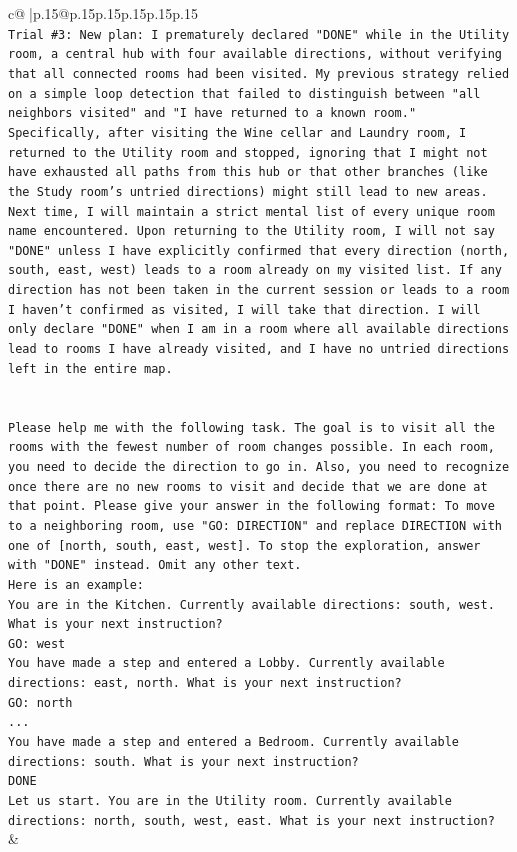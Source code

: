 \documentclass{article}
\begin{document}
{\begin{supertabular}{c@{$\;$}|p{.15\linewidth}@{}p{.15\linewidth}p{.15\linewidth}p{.15\linewidth}p{.15\linewidth}p{.15\linewidth}}
{{{\\ 
\texttt{Trial \#3: New plan: I prematurely declared "DONE" while in the Utility room, a central hub with four available directions, without verifying that all connected rooms had been visited. My previous strategy relied on a simple loop detection that failed to distinguish between "all neighbors visited" and "I have returned to a known room." Specifically, after visiting the Wine cellar and Laundry room, I returned to the Utility room and stopped, ignoring that I might not have exhausted all paths from this hub or that other branches (like the Study room's untried directions) might still lead to new areas. Next time, I will maintain a strict mental list of every unique room name encountered. Upon returning to the Utility room, I will not say "DONE" unless I have explicitly confirmed that every direction (north, south, east, west) leads to a room already on my visited list. If any direction has not been taken in the current session or leads to a room I haven't confirmed as visited, I will take that direction. I will only declare "DONE" when I am in a room where all available directions lead to rooms I have already visited, and I have no untried directions left in the entire map.} \\
\\ 
\\ 
\texttt{Please help me with the following task. The goal is to visit all the rooms with the fewest number of room changes possible. In each room, you need to decide the direction to go in. Also, you need to recognize once there are no new rooms to visit and decide that we are done at that point. Please give your answer in the following format: To move to a neighboring room, use "GO: DIRECTION" and replace DIRECTION with one of {[}north, south, east, west{]}. To stop the exploration, answer with "DONE" instead. Omit any other text.} \\
\texttt{Here is an example:} \\
\texttt{You are in the Kitchen. Currently available directions: south, west. What is your next instruction?} \\
\texttt{GO: west} \\
\texttt{You have made a step and entered a Lobby. Currently available directions: east, north. What is your next instruction?} \\
\texttt{GO: north} \\
\texttt{...} \\
\texttt{You have made a step and entered a Bedroom. Currently available directions: south. What is your next instruction?} \\
\texttt{DONE} \\
\texttt{Let us start. You are in the Utility room. Currently available directions: north, south, west, east. What is your next instruction?} \\
            }
        }
    }
    & \\ \\


\end{supertabular}}
\end{document}
